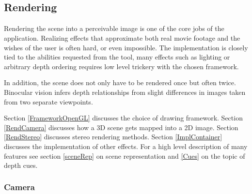 \subsection{Rendering}
\paragraph{}
Rendering the scene into a perceivable image is one of the core jobs of the application.
Realizing effects that approximate both real movie footage and the wishes of the user is often hard, or even impossible.
The implementation is closely tied to the abilities requested from the tool, many effects such as lighting or arbitrary depth ordering requires low level trickery with the chosen framework.

In addition, the scene does not only have to be rendered once but often twice.
Binocular vision infers depth relationships from slight differences in images taken from two separate viewpoints.

Section \ref{FrameworkOpenGL} discusses the choice of drawing framework.
Section \ref{RendCamera} discusses how a 3D scene gets mapped into a 2D image.
Section \ref{RendStereo} discusses stereo rendering methods.
Section \ref{ImplContainer} discusses the implementation of other effects.
For a high level description of many features see section \ref{sceneRep} on scene representation and \ref{Cues} on the topic of depth cues.


\subsubsection{Camera\label{RendCamera}}

